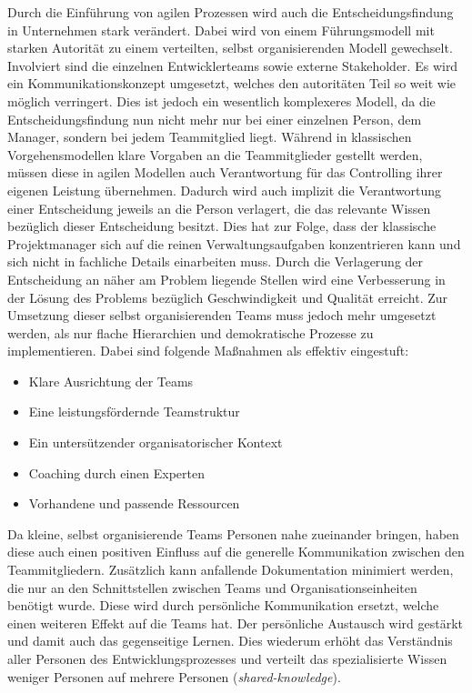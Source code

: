 Durch die Einführung von agilen Prozessen wird auch die Entscheidungsfindung in Unternehmen stark verändert.
Dabei wird von einem Führungsmodell mit starken Autorität zu einem verteilten, selbst organisierenden Modell gewechselt.
Involviert sind die einzelnen Entwicklerteams sowie externe Stakeholder.
Es wird ein Kommunikationskonzept umgesetzt, welches den autoritäten Teil so weit wie möglich verringert.
Dies ist jedoch ein wesentlich komplexeres Modell, da die Entscheidungsfindung nun nicht mehr nur bei einer einzelnen Person, dem Manager, sondern bei jedem Teammitglied liegt.
Während in klassischen Vorgehensmodellen klare Vorgaben an die Teammitglieder gestellt werden, müssen diese in agilen Modellen auch Verantwortung für das Controlling ihrer eigenen Leistung übernehmen.
Dadurch wird auch implizit die Verantwortung einer Entscheidung jeweils an die Person verlagert, die das relevante Wissen bezüglich dieser Entscheidung besitzt.
Dies hat zur Folge, dass der klassische Projektmanager sich auf die reinen Verwaltungsaufgaben konzentrieren kann und sich nicht in fachliche Details einarbeiten muss.
Durch die Verlagerung der Entscheidung an näher am Problem liegende Stellen wird eine Verbesserung in der Lösung des Problems bezüglich Geschwindigkeit und Qualität erreicht.
Zur Umsetzung dieser selbst organisierenden Teams muss jedoch mehr umgesetzt werden, als nur flache Hierarchien und demokratische Prozesse zu implementieren.
Dabei sind folgende Maßnahmen als effektiv eingestuft:
\begin{itemize}
\item Klare Ausrichtung der Teams
\item Eine leistungsfördernde Teamstruktur
\item Ein untersützender organisatorischer Kontext
\item Coaching durch einen Experten
\item Vorhandene und passende Ressourcen
\end{itemize}
\parencite[Vgl.][S. 863 f.]{Moe:2012aa}

Da kleine, selbst organisierende Teams Personen nahe zueinander bringen, haben diese auch einen positiven Einfluss auf die generelle Kommunikation zwischen den Teammitgliedern.
Zusätzlich kann anfallende Dokumentation minimiert werden, die nur an den Schnittstellen zwischen Teams und Organisationseinheiten benötigt wurde.
Diese wird durch persönliche Kommunikation ersetzt, welche einen weiteren Effekt auf die Teams hat. 
Der persönliche Austausch wird gestärkt und damit auch das gegenseitige Lernen.
Dies wiederum erhöht das Verständnis aller Personen des Entwicklungsprozesses und verteilt das spezialisierte Wissen weniger Personen auf mehrere Personen (\emph{shared-knowledge}).
\parencite[Vgl.][S. 685]{Petersen:2010aa}

